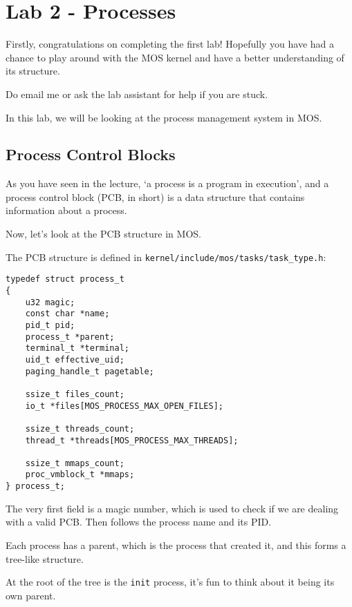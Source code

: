\chapter{Lab 2 - Processes}

Firstly, congratulations on completing the first lab! Hopefully you have had a chance to play
around with the MOS kernel and have a better understanding of its structure.

\begin{note}
    \item Do email me or ask the lab assistant for help if you are stuck.
\end{note}

In this lab, we will be looking at the process management system in MOS.

\section{Process Control Blocks}

As you have seen in the lecture, `a process is a program in execution', and a process control
block (PCB, in short) is a data structure that contains information about a process.

Now, let's look at the PCB structure in MOS.

The PCB structure is defined in \texttt{kernel/include/mos/tasks/task\_type.h}:

\begin{verbatim}
typedef struct process_t
{
    u32 magic;
    const char *name;
    pid_t pid;
    process_t *parent;
    terminal_t *terminal;
    uid_t effective_uid;
    paging_handle_t pagetable;

    ssize_t files_count;
    io_t *files[MOS_PROCESS_MAX_OPEN_FILES];

    ssize_t threads_count;
    thread_t *threads[MOS_PROCESS_MAX_THREADS];

    ssize_t mmaps_count;
    proc_vmblock_t *mmaps;
} process_t;
\end{verbatim}

The very first field is a magic number, which is used to check if we are dealing with a valid
PCB. Then follows the process name and its PID.

Each process has a parent, which is the process that created it, and this forms a tree-like
structure.

\begin{note}
    \item At the root of the tree is the \texttt{init} process, it's fun to think about
    it being its own parent.
\end{note}

